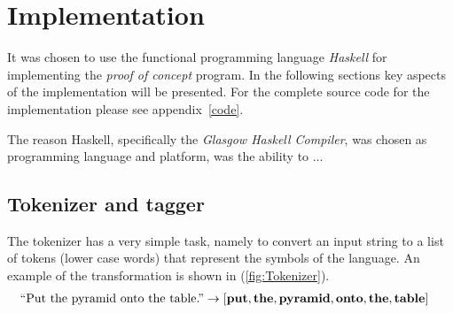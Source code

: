 
\chapter{Implementation}
\label{chap:Implementation}

It was chosen to use the functional programming language \emph{Haskell} for implementing the \emph{proof of concept} program. In the following sections key aspects of the implementation will be presented. For the complete source code for the implementation please see appendix~\ref{code}.

The reason Haskell, specifically the \emph{Glasgow Haskell Compiler}, was chosen as programming language and platform, was the ability to ... 
\clearpage


\section{Tokenizer and tagger}
The tokenizer has a very simple task, namely to convert an input string to a list of tokens (lower case words) that represent the symbols of the language. An example of the transformation is shown in
(\ref{fig:Tokenizer}).
\begin{align}
  &\text{``Put the pyramid onto the table.''} \to 
  \left[ 
  \mathbf{put}, \mathbf{the}, \mathbf{pyramid}, \mathbf{onto}, \mathbf{the}, \mathbf{table} 
  \right] 
  \label{fig:Tokenizer}
\end{align}

